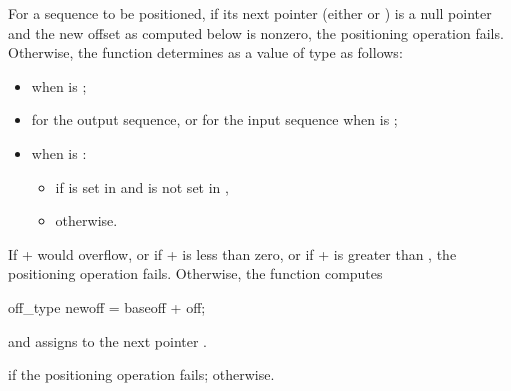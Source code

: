 \documentclass[ebook,11pt,article]{memoir}
\renewcommand{\iref}[1]{[#1]}
\begin{document}
\begin{itemdescr}
\pnum
For a sequence to be positioned, if its next pointer 
(either
or
)
is a null pointer and the new offset  as computed below is nonzero, the positioning
operation fails. Otherwise, the function determines  as a value of type  as follows:
\begin{itemize}
\item {} when  is ;
\item {} for the output sequence, or \newline
       for the input sequence when  is ;
\item when  is  :  
\begin{itemize}
\item {} if  is set in  and  is not set in , 
\item {} otherwise.
\end{itemize}
\end{itemize}




%

\pnum
If  +  would overflow, or 
if  +  is less than zero, or 
if  +  is greater than ,
the positioning operation fails.
Otherwise, the function computes 
\begin{codeblock}
off_type newoff = baseoff + off;
\end{codeblock}
and assigns
to the next pointer .

\pnum
\returns
{} if the positioning operation fails;
 otherwise.
\end{itemdescr}
\end{document}
